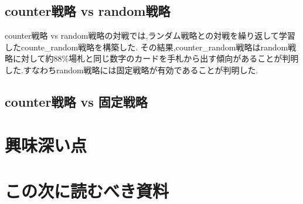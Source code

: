 \documentclass{jarticle}     %
\begin{document}
\subsection*{counter戦略 vs random戦略}
counter戦略 vs random戦略の対戦では,ランダム戦略との対戦を繰り返して学習したcounte\_random戦略を構築した.
その結果,counter\_random戦略はrandom戦略に対して約88\%場札と同じ数字のカードを手札から出す傾向があることが判明した.すなわちrandom戦略には固定戦略が有効であることが判明した.
\subsection*{counter戦略 vs 固定戦略}

\section*{興味深い点}

\section*{この次に読むべき資料}




\end{document}
